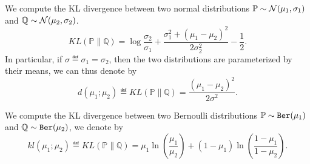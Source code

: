 \begin{example}\label{ex:maths.kl_gaussian}
\begin{leftbar}[examplebar]
	We compute the KL divergence between two normal distributions $\mathbb{P}\sim\mathcal{N}(\mu_1,\sigma_1)$ and $\mathbb{Q}\sim\mathcal{N}(\mu_2,\sigma_2)$.
	\[
		KL(\mathbb{P} \lVert \mathbb{Q}) = \log \frac{\sigma_2}{\sigma_1} + \frac{\sigma_1^2+(\mu_1-\mu_2)^2}{2\sigma_2^2} - \frac{1}{2}.
	\]
In particular, if $\sigma\eqdef\sigma_1=\sigma_2$, then the two distributions are parameterized by their means, we can thus denote by
	\[
		d(\mu_1;\mu_2) \eqdef KL(\mathbb{P} \lVert \mathbb{Q}) = \frac{(\mu_1-\mu_2)^2}{2\sigma^2}.
	\]
\end{leftbar}
\end{example}

\begin{example}\label{ex:maths.kl_bernoulli}
\begin{leftbar}[examplebar]
    We compute the KL divergence between two Bernoulli distributions $\mathbb{P}\sim\texttt{Ber}(\mu_1)$ and $\mathbb{Q}\sim\texttt{Ber}(\mu_2)$, we denote by
     \[
        kl(\mu_1;\mu_2) \eqdef KL(\mathbb{P} \lVert \mathbb{Q}) =  \mu_1 \ln \left( \frac{\mu_1}{\mu_2} \right) + (1-\mu_1) \ln  \left( \frac{1-\mu_1}{1-\mu_2} \right).
    \]
\end{leftbar}
\end{example}
